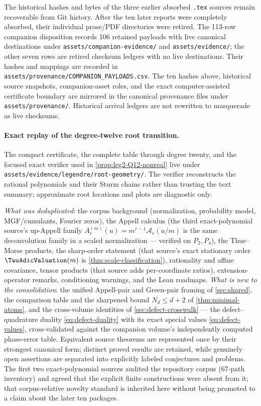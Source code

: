 \documentclass[11pt,oneside]{article}
\numberwithin{equation}{section}
\theoremstyle{definition}
\theoremstyle{remark}
\newcommand{\Gd}{\mathcal A}
\begin{document}
The historical hashes and bytes of the three earlier absorbed \texttt{.tex}
sources remain recoverable from Git history.  After the ten later reports were
completely absorbed, their individual prose/PDF directories were retired.  The
113-row companion disposition records 106 retained payloads with live canonical
destinations under \nolinkurl{assets/companion-evidence/} and
\nolinkurl{assets/evidence/}; the other seven rows are retired checksum ledgers
with no live destinations.  Their hashes and mappings are recorded in
\nolinkurl{assets/provenance/COMPANION_PAYLOADS.csv}.  The ten hashes above,
historical source snapshots, companion-asset roles, and the exact
computer-assisted certificate boundary are mirrored in the canonical
provenance files under \nolinkurl{assets/provenance/}.  Historical arrival
ledgers are not rewritten to masquerade as live checksums.
\paragraph{Exact replay of the degree-twelve root transition.}
The compact certificate, the complete table through degree twenty, and the
focused exact verifier used in \cref{prop:leg2-Q12-nonreal} live under
\nolinkurl{assets/evidence/legendre/root-geometry/}.  The verifier reconstructs
the rational polynomials and their Sturm chains rather than trusting the text
summary; approximate root locations and plots are diagnostic only.

\emph{What was deduplicated}: the corpus background (normalization,
probability model, MGF/cumulants, Fourier zeros), the Appell
calculus (the third exact-polynomial source's up-Appell family
$A^{(m)}_r(u)=m^{r-1}\Gd_r(u/m)$ is the same deconvolution family in
a scaled normalization --- verified on $P_2,P_4$), the Thue--Morse
products, the sharp-order statement (that source's exact
stationary order $\TwoAdicValuation(m)$ is
\cref{thm:scale-classification}), rationality and affine covariance,
tensor products (that source adds per-coordinate ratios),
extension-operator remarks, conditioning warnings, and the Lean
roadmaps.
\emph{What is new to the consolidation}: the unified Appell-pair and
Green-pair framing of \cref{sec:shared}, the comparison table and the
sharpened bound $N_d\le d+2$ of \cref{thm:minimal-atoms}, and the
cross-volume identities of \cref{sec:defect-crosswalk} --- the
defect--quadrature duality \eqref{eq:defect-duality} with its exact
special values \eqref{eq:defect-values}, cross-validated against the
companion volume's independently computed phase-error table.  Equivalent
source theorems are represented once by their strongest canonical form;
distinct proved results are retained, while genuinely open assertions are
separated into explicitly labeled conjectures and problems.  The first two
exact-polynomial sources audited the repository corpus (67-path inventory) and
agreed that the explicit finite constructions were absent from it; that
corpus-relative novelty standard is inherited here without being promoted to
a claim about the later ten packages.
\end{document}
